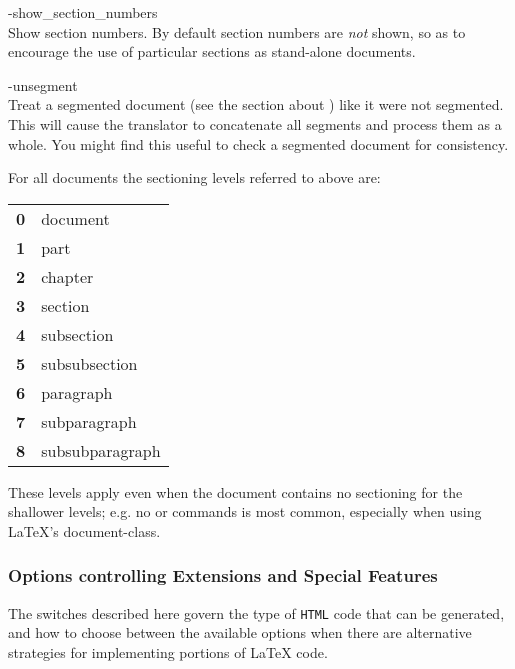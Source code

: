 \begin{htmllist}
%

\item [ -show\_section\_numbers\label{cs_showsecnums}]
\\
Show section numbers. By default section numbers are \emph{not} shown, 
so as to encourage the use of particular sections as stand-alone documents. 


\item [ -unsegment\label{cs_unsegment}]
\\
Treat a segmented document (see the section about ) like it were not segmented.
This will cause the translator to concatenate all segments and process
them as a whole.
You might find this useful to check a segmented document for
consistency.
%
\end{htmllist}

\goodbreak
{}\label{seclevels}%
\html{\\}\noindent
For all documents the sectioning levels referred to above are:\nobreak
\begin{center}
\begin{tabular}{ll}
\textbf{0} & document\\
\textbf{1} & part\\
\textbf{2} & chapter\\
\textbf{3} & section\\
\textbf{4} & subsection\\
\textbf{5} & subsubsection\\
\textbf{6} & paragraph\\
\textbf{7} & subparagraph\\
\textbf{8} & subsubparagraph
\end{tabular}
\end{center}
These levels apply even when the document contains no sectioning for
the shallower levels; e.g. no  or  commands is most common,
especially when using \LaTeX's  document-class.



\subsubsection{Options controlling Extensions and Special Features}
%
%
\html{\\}\noindent
The switches described here govern the type of \texttt{HTML} code that
can be generated, and how to choose between the available options 
when there are alternative strategies for implementing portions of \LaTeX{} code. 

